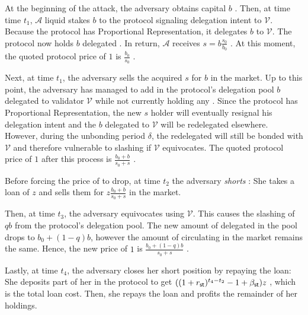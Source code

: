 At the beginning of the attack, the adversary obtains capital
$b$ \asset. Then, at time time $t_1$, $\mathcal{A}$
liquid stakes $b$ \asset to the protocol
signaling delegation intent to $\mathcal{V}$. Because the
protocol has Proportional Representation, it delegates $b$ \asset to $\mathcal{V}$.
The protocol now holds $b$ delegated \asset.
In return, $\mathcal{A}$ receives $s = b \frac{s_0}{b_0}$ \stasset.
At this moment, the quoted protocol price of $1$ \stasset is
$\frac{b_0}{s_0}$ \asset.

Next, at time $t_1$, the adversary sells the acquired $s$ \stasset for
$b$ \asset in the market.
Up to this point, the adversary
has managed to add in the protocol's delegation pool $b$
\asset delegated to validator $\mathcal{V}$ while not currently holding
any \stasset.
Since the protocol has Proportional Representation, the new $s$
\stasset holder will eventually resignal his delegation intent and the
$b$ \asset delegated to $\mathcal{V}$ will be redelegated elsewhere.
However, during the unbonding period $\delta$, the redelegated \asset will
still be bonded with $\mathcal{V}$ and therefore vulnerable to slashing
if $\mathcal{V}$ equivocates.
The quoted protocol price of $1$ \stasset after this process
is $\frac{b_0 + b}{s_0 + s}$ \asset.

Before forcing the price of \stasset to drop, at time $t_2$ the adversary \emph{shorts}
\stasset: She takes a loan of $z$ \stasset and sells them for
$z \frac{b_0 + b}{s_0 + s}$ \asset in the market.

Then, at time $t_3$, the adversary equivocates using $\mathcal{V}$.
This causes the slashing of $qb$ \asset from the protocol's delegation
pool. The new amount of delegated \asset in the pool drops to
$b_0 + (1 - q) b$, however the amount of \stasset circulating in the
market remains the same. Hence, the new price of $1$ \stasset is
$\frac{b_0 + (1 - q) b}{s_0 + s}$ \asset.

Lastly, at time $t_4$, the adversary closes her short position by repaying the
\stasset loan: She deposits part of her \asset in the protocol
to get $((1 + r_{\textsf{st}})^{t_4 - t_2} - 1 + \beta_{\textsf{st}}) z$ \stasset, which
is the total loan cost. Then, she repays the loan and profits the remainder of
her \asset holdings.

